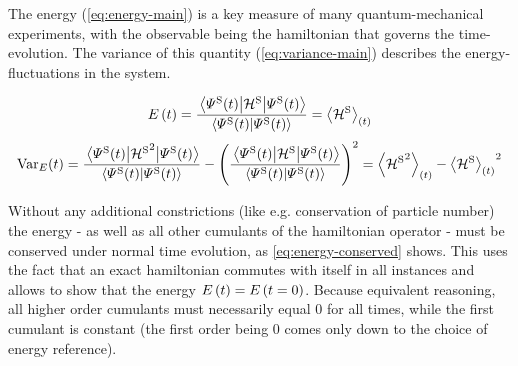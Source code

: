 The energy \energyOft (\autoref{eq:energy-main}) is a key measure of many quantum-mechanical experiments, with the observable being the hamiltonian that governs the time-evolution.
The variance \varianceOft of this quantity (\autoref{eq:variance-main}) describes the energy-fluctuations in the system.

\begin{equation}
    \label{eq:energy-main}
    \energyOft = \frac{\bracketHelper{\psiOfT[\schroedingerPicture]}{\pictureHamiltonian[\schroedingerPicture]}{\psiOfT[\schroedingerPicture]}}{\braketHelper{\psiOfT[\schroedingerPicture]}{\psiOfT[\schroedingerPicture]}}
       = \timeExpectationVal{\pictureHamiltonian[\schroedingerPicture]}
\end{equation}
\begin{equation}
    \label{eq:variance-main}
    \varianceOft = \frac{\bracketHelper{\psiOfT[\schroedingerPicture]}{{\pictureHamiltonian[\schroedingerPicture]}^2}{\psiOfT[\schroedingerPicture]}}{\braketHelper{\psiOfT[\schroedingerPicture]}{\psiOfT[\schroedingerPicture]}}-\left(\frac{\bracketHelper{\psiOfT[\schroedingerPicture]}{\pictureHamiltonian[\schroedingerPicture]}{\psiOfT[\schroedingerPicture]}}{\braketHelper{\psiOfT[\schroedingerPicture]}{\psiOfT[\schroedingerPicture]}}\right)^2
       = \timeExpectationVal{{\pictureHamiltonian[\schroedingerPicture]}^2} - {\timeExpectationVal{\pictureHamiltonian[\schroedingerPicture]}}^2
\end{equation}

Without any additional constrictions (like e.g. conservation of particle number) the energy - as well as all other cumulants of the hamiltonian operator - must be conserved under normal time evolution, as \autoref{eq:energy-conserved} shows. This uses the fact that an exact hamiltonian commutes with itself in all instances and allows to show that the energy $\energyOft = \energyOft[t=0]$.
Because equivalent reasoning, all higher order cumulants must necessarily equal $0$ for all times, while the first cumulant %
is constant (the first order being 0 comes only down to the choice of energy reference).

